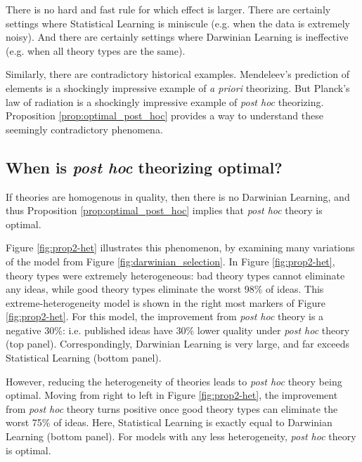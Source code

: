 \documentclass[12pt,english]{article}
\theoremstyle{plain}
\theoremstyle{plain}
\begin{document}
There is no hard and fast rule for which effect is larger. There are certainly settings where Statistical Learning is miniscule (e.g. when the data is extremely noisy). And there are certainly settings where Darwinian Learning is ineffective (e.g. when all theory types are the same). 

Similarly, there are contradictory historical examples. Mendeleev's prediction of elements is a shockingly impressive example of \emph{a priori} theorizing. But Planck's law of radiation is a shockingly impressive example of \emph{post hoc} theorizing. Proposition \ref{prop:optimal_post_hoc} provides a way to understand these seemingly contradictory phenomena.


\subsection{When is \emph{post hoc} theorizing optimal?}\label{sec:het-figures}

If theories are homogenous in quality, then there is no Darwinian Learning, and thus Proposition \ref{prop:optimal_post_hoc} implies that \emph{post hoc} theory is optimal.

Figure \ref{fig:prop2-het} illustrates this phenomenon, by examining many variations of the model from Figure \ref{fig:darwinian_selection}. In Figure \ref{fig:prop2-het}, theory types were extremely heterogeneous: bad theory types cannot eliminate any ideas, while good theory types eliminate the worst 98\% of ideas. This extreme-heterogeneity model is shown in the right most markers of Figure \ref{fig:prop2-het}. For this model, the improvement from \emph{post hoc} theory is a negative 30\%: i.e. published ideas have 30\% lower quality under \emph{post hoc} theory (top panel). Correspondingly, Darwinian Learning is very large, and far exceeds Statistical Learning (bottom panel).

However, reducing the heterogeneity of theories leads to \emph{post hoc} theory being optimal. Moving from right to left in Figure \ref{fig:prop2-het}, the improvement from \emph{post hoc} theory turns positive once good theory types can eliminate the worst 75\% of ideas. Here, Statistical Learning is exactly equal to Darwinian Learning (bottom panel). For models with any less heterogeneity, \emph{post hoc} theory is optimal. 
\end{document}
